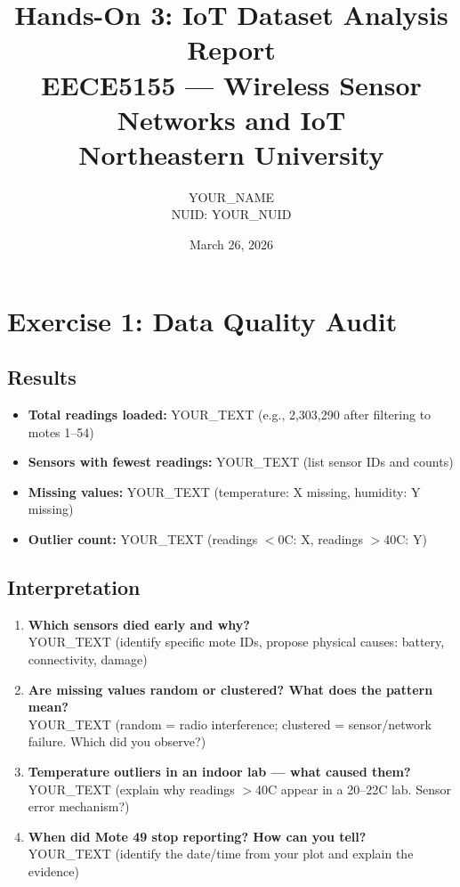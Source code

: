 \documentclass[11pt,a4paper]{article}
\title{%
  \textbf{Hands-On 3: IoT Dataset Analysis Report}\\[0.3cm]
  \large EECE5155 — Wireless Sensor Networks and IoT\\
  Northeastern University
}
\author{
  YOUR\_NAME\\
  NUID: YOUR\_NUID
}
\date{March 26, 2026}
\begin{document}
\maketitle
\thispagestyle{fancy}

\section{Exercise 1: Data Quality Audit}

\subsection{Results}

\begin{itemize}[leftmargin=*]
  \item \textbf{Total readings loaded:} YOUR\_TEXT (e.g., 2,303,290 after filtering to motes 1--54)
  \item \textbf{Sensors with fewest readings:} YOUR\_TEXT (list sensor IDs and counts)
  \item \textbf{Missing values:} YOUR\_TEXT (temperature: X missing, humidity: Y missing)
  \item \textbf{Outlier count:} YOUR\_TEXT (readings $<$0\textdegree{}C: X, readings $>$40\textdegree{}C: Y)
\end{itemize}

\subsection{Interpretation}

\begin{enumerate}[leftmargin=*]
  \item \textbf{Which sensors died early and why?}\\
  YOUR\_TEXT (identify specific mote IDs, propose physical causes: battery, connectivity, damage)

  \item \textbf{Are missing values random or clustered? What does the pattern mean?}\\
  YOUR\_TEXT (random = radio interference; clustered = sensor/network failure. Which did you observe?)

  \item \textbf{Temperature outliers in an indoor lab — what caused them?}\\
  YOUR\_TEXT (explain why readings $>$40\textdegree{}C appear in a 20--22\textdegree{}C lab. Sensor error mechanism?)

  \item \textbf{When did Mote 49 stop reporting? How can you tell?}\\
  YOUR\_TEXT (identify the date/time from your plot and explain the evidence)
\end{enumerate}
\end{document}
